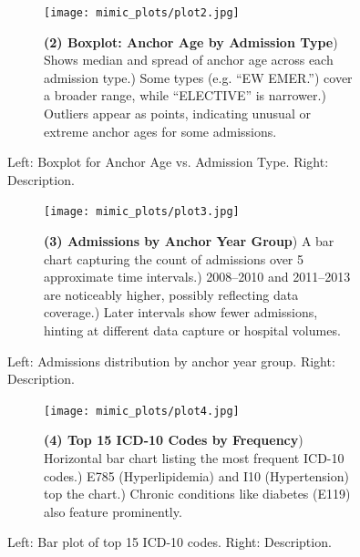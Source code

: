 \documentclass[12pt,a4paper]{report}
\begin{document}
\begin{figure}[ht!]
    \centering
    \begin{subfigure}{0.42\textwidth}
        \texttt{[image: mimic\_plots/plot2.jpg]}
    \end{subfigure}\hfill
    \begin{subfigure}{0.54\textwidth}
        \footnotesize
        \textbf{(2) Boxplot: Anchor Age by Admission Type}) Shows median and spread of anchor age across each admission type.) Some types (e.g. “EW EMER.”) cover a broader range, while “ELECTIVE” is narrower.) Outliers appear as points, indicating unusual or extreme anchor ages for some admissions.
    \end{subfigure}
    \caption{Left: Boxplot for Anchor Age vs. Admission Type. Right: Description.}
    \label{fig:plot2}
\end{figure}

\begin{figure}[ht!]
    \centering
    \begin{subfigure}{0.42\textwidth}
        \texttt{[image: mimic\_plots/plot3.jpg]}
    \end{subfigure}\hfill
    \begin{subfigure}{0.54\textwidth}
        \footnotesize
        \textbf{(3) Admissions by Anchor Year Group}) A bar chart capturing the count of admissions over 5 approximate time intervals.) 2008--2010 and 2011--2013 are noticeably higher, possibly reflecting data coverage.) Later intervals show fewer admissions, hinting at different data capture or hospital volumes.
    \end{subfigure}
    \caption{Left: Admissions distribution by anchor year group. Right: Description.}
    \label{fig:plot3}
\end{figure}

\begin{figure}[ht!]
    \centering
    \begin{subfigure}{0.42\textwidth}
        \texttt{[image: mimic\_plots/plot4.jpg]}
    \end{subfigure}\hfill
    \begin{subfigure}{0.54\textwidth}
        \footnotesize
        \textbf{(4) Top 15 ICD-10 Codes by Frequency}) Horizontal bar chart listing the most frequent ICD-10 codes.) E785 (Hyperlipidemia) and I10 (Hypertension) top the chart.) Chronic conditions like diabetes (E119) also feature prominently.
    \end{subfigure}
    \caption{Left: Bar plot of top 15 ICD-10 codes. Right: Description.}
    \label{fig:plot4}
\end{figure}
\end{document}
